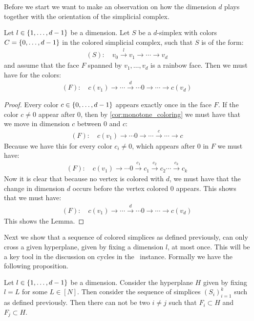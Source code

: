 Before we start we want to make an observation on how the dimension $d$ plays together with the orientation of the simplicial complex.
\begin{lemma}
	\label{lem:position_of_d_in_simplex}
	Let $l \in \left\{1, \dots, d-1\right\}$ be a dimension. Let $S$ be a $d$-simplex with colors $C = \left\{0, \dots, d-1\right\}$ in the colored simplicial complex, such that $S$ is of the form:
	\begin{align*}
		(S): \quad v_0 \xrightarrow{l} v_1 \xrightarrow{} \cdots \xrightarrow{} v_d
	\end{align*}
	and assume that the face $F$ spanned by $v_1, \dots, v_d$ is a rainbow face. Then we must have for the colors:
	\begin{align*}
		(F): \quad c(v_1) \xrightarrow{}  \cdots \xrightarrow{d} \cdots  0 \xrightarrow{} \cdots \xrightarrow{} c(v_d)
	\end{align*}
\end{lemma}
\begin{proof}
	Every color $c \in \left\{0, \dots, d-1\right\}$ appears exactly once in the face $F$. If the color $c \neq 0$ appear after $0$, then by \cref{cor:monotone_coloring} we must have that we move in dimension $c$ between $0$ and $c$:
	\begin{align*}
		(F): \quad c(v_1) \xrightarrow{} \cdots  0 \xrightarrow{} \cdots \xrightarrow{c} \cdots \xrightarrow{} c
	\end{align*}
	Because we have this for every color $c_i \neq 0$, which appears after $0$ in $F$ we must have:
	\begin{align*}
		(F): \quad c(v_1) \xrightarrow{} \cdots  0 \xrightarrow{c_1} c_1 \xrightarrow{c_2} c_2 \cdots \xrightarrow{c_k} c_k
	\end{align*}
	Now it is clear that because no vertex is colored with $d$, we must have that the change in dimension $d$ occurs before the vertex colored $0$ appears. This shows that we must have:
	\begin{align*}
		(F): \quad c(v_1) \xrightarrow{}  \cdots \xrightarrow{d} \cdots  0 \xrightarrow{} \cdots \xrightarrow{} c(v_d)
	\end{align*}
	This shows the Lemma.
\end{proof}
Next we show that a sequence of colored simplices as defined previously, can only cross a given hyperplane, given by fixing a dimension $l$, at most once. This will be a key tool in the discussion on cycles in the \EndOfLine\ instance. Formally we have the following proposition.
\begin{proposition}
	Let $l \in \left\{1, \dots, d-1\right\}$ be a dimension. Consider the hyperplane $H$ given by fixing $l = L$ for some $L \in [N]$. Then consider the sequence of simplices $\left(S_i\right)_{i=1}^{k}$ such as defined previously. Then there can not be two $i \neq j$ such that $F_i \subset H$ and $F_j \subset H$.
\end{proposition}

